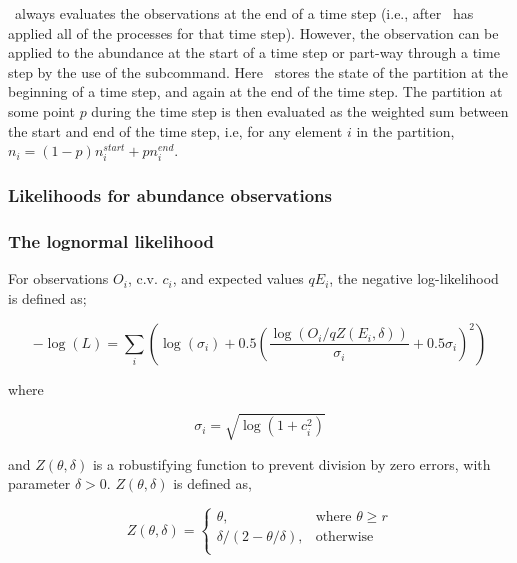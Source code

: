 \SPM\ always evaluates the observations at the end of a time step (i.e., after \SPM\ has applied all of the processes for that time step). However, the observation can be applied to the abundance at the start of a time step or part-way through a time step by the use of the  subcommand. Here \SPM\ stores the state of the partition at the beginning of a time step, and again at the end of the time step. The partition at some point $p$ during the time step is then evaluated as the weighted sum between the start and end of the time step, i.e, for any element $i$ in the partition, $n_i=(1-p) n_i^{start} + p n_i^{end}$.

\subsubsection{Likelihoods for abundance observations}

\subsubsection*{The lognormal likelihood}

For observations $O_i$, c.v. $c_i$, and expected values $qE_i$, the negative log-likelihood is defined as;

\begin{equation}
 - \log \left(L \right) = \sum\limits_i \left( \log \left( \sigma _i \right) + 0.5\left( \frac{\log \left(O_i / q Z \left(E_i,\delta \right) \right)}{\sigma_i} + 0.5 \sigma_i \right)^2 \right)
\end{equation}

where 

\begin{equation}
  \sigma_i  = \sqrt{\log \left(1+c_i^2 \right)}
\end{equation}

and $Z \left(\theta,\delta \right)$ is a robustifying function to prevent division by zero errors, with parameter $\delta>0$. $Z \left(\theta,\delta \right)$ is defined as,

\begin{equation}
   Z \left(\theta,\delta \right) = \begin{cases}
	  \theta, & \text{where $\theta \ge r$} \\
	  \delta/\left( 2-\theta/\delta \right), & \text{otherwise} \\  
  \end{cases}
\end{equation}

